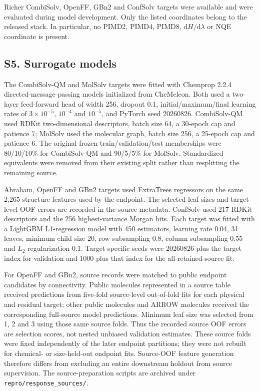 Richer CombiSolv, OpenFF, GBn2 and ConfSolv targets were
available and were evaluated during model development. Only the listed coordinates
belong to the released stack. In particular, no PIMD2, PIMD4, PIMD8,
$\mathrm{d}H/\mathrm{d}\lambda$ or NQE coordinate is present.

\subsection*{S5. Surrogate models}

The CombiSolv-QM and MolSolv targets were fitted with Chemprop 2.2.4
directed-message-passing models initialized from CheMeleon. Both used a two-layer
feed-forward head of width 256, dropout 0.1, initial/maximum/final learning rates of
$3\times10^{-5}$, $10^{-4}$ and $10^{-5}$, and PyTorch seed 20260826. CombiSolv-QM
used RDKit two-dimensional descriptors, batch size 64, a 30-epoch cap and patience 7; MolSolv used the
molecular graph, batch size 256, a 25-epoch cap and patience 6. The original frozen
train/validation/test memberships were 80/10/10\% for CombiSolv-QM and 90/5/5\% for
MolSolv. Standardized equivalents were removed from their existing split rather than
resplitting the remaining source.

Abraham, OpenFF and GBn2 targets used ExtraTrees regressors on the same 2,265
structure features used by the endpoint. The selected leaf sizes and target-level
OOF errors are recorded in the source metadata. ConfSolv used 217 RDKit descriptors
and the 256 highest-variance Morgan bits. Each target was fitted with a LightGBM
L1-regression model with 450 estimators, learning rate 0.04, 31 leaves, minimum child
size 20, row subsampling 0.8, column subsampling 0.55 and $L_2$ regularization 0.1.
Target-specific seeds were 20260826 plus the target index for validation and 1000
plus that index for the all-retained-source fit.

For OpenFF and GBn2, source records were matched to public endpoint candidates by
connectivity. Public molecules represented in a source table received predictions
from five-fold source-level out-of-fold fits for each physical and residual target;
other public molecules and ARROW molecules received the corresponding full-source
model predictions. Minimum leaf size was selected from 1, 2 and 3 using those same
source folds. Thus the recorded source OOF errors are selection scores, not nested
unbiased validation estimates. These source folds were fixed independently of the
later endpoint partitions; they were not rebuilt for chemical- or size-held-out
endpoint fits. Source-OOF feature generation therefore differs from excluding an
entire downstream holdout from source supervision. The source-preparation scripts
are archived under \texttt{repro/response\_sources/}.


